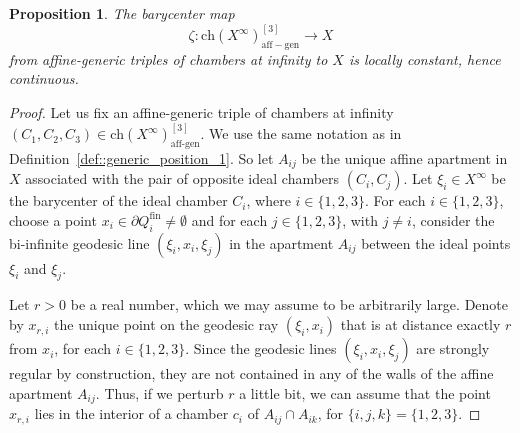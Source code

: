 \documentclass[11pt]{amsart}
\newcommand{\affgen}{\Ch(X^\infty)_{\mathrm{aff-gen}}^{[3]}}
\newcommand{\Ch}{\mathrm{ch}}
\theoremstyle{plain}
\newtheorem{prop}[thm]{Proposition}
\theoremstyle{definition}
\theoremstyle{remark}
\begin{document}
	
	\begin{prop}\label{prop::barycenter_map}
		The barycenter map \[\zeta: \affgen\to X \]
		from affine-generic triples of chambers at infinity to $X$ is locally constant, hence continuous. 
	\end{prop}
	\begin{proof}
		Let us fix  an affine-generic triple of chambers at infinity $(C_1, C_2, C_3) \in \Ch(X^\infty)^{[3]}_{\mathrm{aff\text{-}gen}}$. We use the same notation as in Definition~\ref{def::generic_position_1}. So let $A_{ij}$ be the unique affine apartment in $X$ associated with the pair of opposite ideal chambers $(C_i, C_j)$.  Let $\xi_i \in X^\infty$ be the barycenter of the ideal chamber $C_i$, where $i \in \{1,2,3\}$. For each $i \in \{1,2,3\}$, choose a point $x_{i} \in \partial Q_i^{\mathrm{fin}}  \neq \emptyset$ and for each $j \in \{1,2,3\}$, with $j \neq i$, consider the bi-infinite geodesic line $(\xi_i, x_i, \xi_j)$ in the apartment $A_{ij}$ between the ideal points $\xi_i$ and $\xi_j$. 
		
		Let $r > 0$ be a real number, which we may assume to be arbitrarily large.  Denote by $x_{r,i}$ the unique point on the geodesic ray $(\xi_i, x_i)$ that is at distance exactly $r$ from $x_i$, for each $i \in \{1,2,3\}$. Since the geodesic lines $(\xi_i, x_i, \xi_j)$ are strongly regular by construction, they are not contained in any of the walls of the affine apartment $A_{ij}$. Thus, if we perturb \( r \) a little bit, we can assume that the point \( x_{r,i} \) lies in the interior of a chamber \( c_{i} \) of \( A_{ij} \cap A_{ik} \), for $\{i,j,k\} = \{1,2,3\}$.
		

\end{proof}
\end{document}
